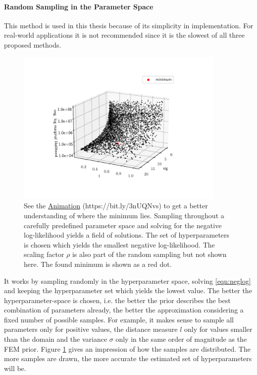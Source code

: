\documentclass[%
  a4paper,oneside,%
  11pt,%
  smallchapters,
  style=printdev,
  extramargin,
  green,%
  rgb, <cmyk>
  ]{tubsbook}
\begin{document}
\paragraph{Random Sampling in the Parameter Space}
This method is used in this thesis because of its simplicity in implementation. For real-world applications it is not recommended since it is the slowest of all three proposed methods.
\begin{figure}[!ht]
\includegraphics[width=0.9\textwidth]{pics/RandomHyperParSearch.pdf}
\centering
\caption[Point cloud of the random search for the hyperparameters which yield the minimum negative log-likelihood]{See the \href{https://github.com/herluc/herluc.github.io/blob/main/MLL.gif}{Animation} (https://bit.ly/3nUQNvs) to get a better understanding of where the minimum lies. Sampling throughout a carefully predefined parameter space and solving for the negative log-likelihood yields a field of solutions. The set of hyperparameters is chosen which yields the smallest negative log-likelihood. The scaling factor $\rho$ is also part of the random sampling but not shown here. The found minimum is shown as a red dot.}
\label{fig:RandSampHyper}
\end{figure}
It works by sampling randomly in the hyperparameter space, solving \eqref{eqn:neglog} and keeping the hyperparameter set which yields the lowest value. The better the hyperparameter-space is chosen, i.e. the better the prior describes the best combination of parameters already, the better the approximation considering a fixed number of possible samples. For example, it makes sense to sample all parameters only for positive values,  the distance measure $l$ only for values smaller than the domain and the variance $\sigma$ only in the same order of magnitude as the FEM prior. Figure \ref{fig:RandSampHyper} gives an impression of how the samples are distributed.
The more samples are drawn, the more accurate the estimated set of hyperparameters will be.
\FloatBarrier
\end{document}
